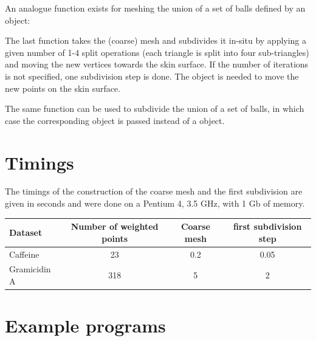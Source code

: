 An analogue function exists for meshing the union of a set of balls
defined by an  object:


The last function takes the (coarse) mesh and subdivides it in-situ by
applying a given number of 1-4 split operations (each triangle is
split into four sub-triangles) and moving the new vertices towards the
skin surface. If the number of iterations is not specified, one
subdivision step is done. The  object is
needed to move the new points on the skin surface.


The same function can be used to subdivide the union of a set of
balls, in which case the corresponding  object is
passed instead of a  object.


%

\section{Timings}
The timings of the construction of the coarse mesh and the first
subdivision are given in seconds and were done on a Pentium 4, 3.5
GHz, with 1 Gb of memory.
\begin{center}
  \begin{tabular}{|l|c|c|c|}
    \hline
    Dataset & Number of weighted points & Coarse mesh & first subdivision step\\
    \hline
    \hline
    Caffeine& 23 & 0.2 & 0.05 \\
    Gramicidin A& 318 & 5 & 2\\
    \hline
  \end{tabular}
\end{center}

\section{Example programs}
